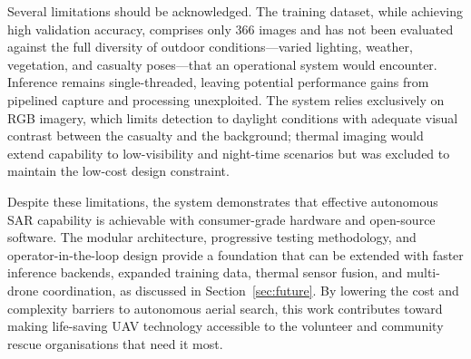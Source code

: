 Several limitations should be acknowledged. The training dataset, while achieving high validation accuracy, comprises only 366 images and has not been evaluated against the full diversity of outdoor conditions---varied lighting, weather, vegetation, and casualty poses---that an operational system would encounter. Inference remains single-threaded, leaving potential performance gains from pipelined capture and processing unexploited. The system relies exclusively on RGB imagery, which limits detection to daylight conditions with adequate visual contrast between the casualty and the background; thermal imaging would extend capability to low-visibility and night-time scenarios but was excluded to maintain the low-cost design constraint.

Despite these limitations, the system demonstrates that effective autonomous SAR capability is achievable with consumer-grade hardware and open-source software. The modular architecture, progressive testing methodology, and operator-in-the-loop design provide a foundation that can be extended with faster inference backends, expanded training data, thermal sensor fusion, and multi-drone coordination, as discussed in Section~\ref{sec:future}. By lowering the cost and complexity barriers to autonomous aerial search, this work contributes toward making life-saving UAV technology accessible to the volunteer and community rescue organisations that need it most.
